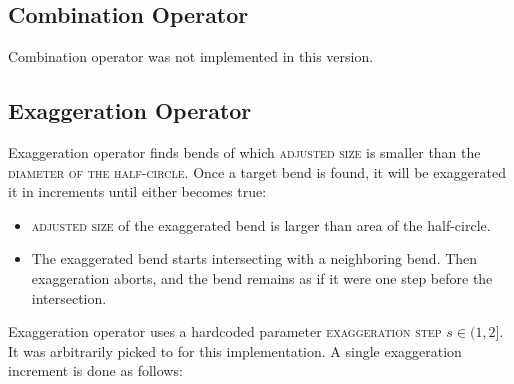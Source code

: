 \documentclass[a4paper]{article}
\begin{document}
\subsection{Combination Operator}

Combination operator was not implemented in this version.

\subsection{Exaggeration Operator}
\label{sec:exaggeration-operator}

Exaggeration operator finds bends of which \textsc{adjusted size} is smaller
than the \textsc{diameter of the half-circle}. Once a target bend is found, it
will be exaggerated it in increments until either becomes true:

\begin{itemize}
    \item \textsc{adjusted size} of the exaggerated bend is larger than area of
        the half-circle.

    \item The exaggerated bend starts intersecting with a neighboring bend.
        Then exaggeration aborts, and the bend remains as if it were one step
        before the intersection.

\end{itemize}

Exaggeration operator uses a hardcoded parameter \textsc{exaggeration step} $s
\in (1,2]$. It was arbitrarily picked to {\exaggerationEnthusiasm} for this
implementation. A single exaggeration increment is done as follows:
\end{document}
